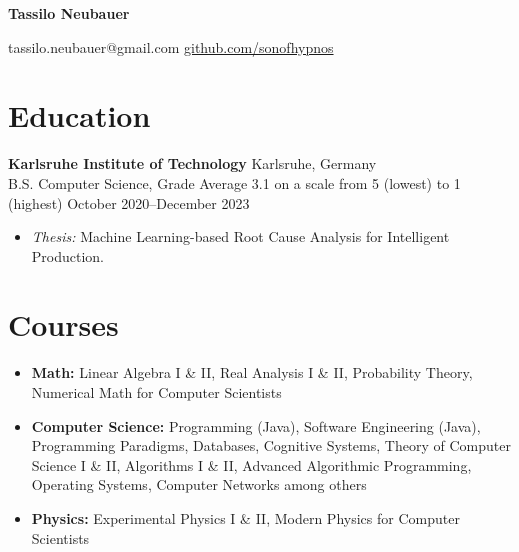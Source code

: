 \documentclass[letterpaper,10pt]{article}
\begin{document}
\begin{center}
\Huge\textbf{Tassilo Neubauer}

\vspace{0.5em}
\large
 \textcolor{accent}{tassilo.neubauer@gmail.com} \hspace{2em}
 \href{https://github.com/sonofhypnos}{github.com/sonofhypnos}
\end{center}

\section*{Education}
\textbf{Karlsruhe Institute of Technology} \hfill Karlsruhe, Germany \\
B.S. Computer Science, Grade Average 3.1 on a scale from 5 (lowest) to 1 (highest) \hfill October 2020--December 2023
\begin{itemize}
    \item \textit{Thesis:} Machine Learning-based Root Cause Analysis for Intelligent Production.
\end{itemize}

\section*{Courses}
\begin{itemize}
    \item \textbf{Math:} Linear Algebra I \& II, Real Analysis I \& II, Probability Theory, Numerical Math for Computer Scientists
    \item \textbf{Computer Science:} Programming (Java), Software Engineering (Java), Programming Paradigms, Databases, Cognitive Systems, Theory of Computer Science I \& II, Algorithms I \& II, Advanced Algorithmic Programming, Operating Systems, Computer Networks among others
    \item \textbf{Physics:} Experimental Physics I \& II, Modern Physics for Computer Scientists
\end{itemize}
\end{document}
